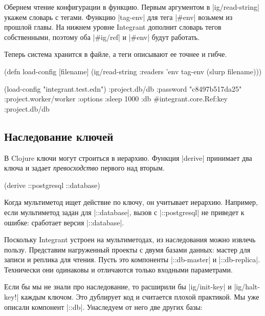 Обернем чтение конфигурации в функцию. Первым аргументом в
\spverb|ig/read-string| укажем словарь с тегами. Функцию \spverb|tag-env| для
тега \spverb|#env| возьмем из прошлой главы. На нижнем уровне Integrant
дополнит словарь тегов собственными, поэтому оба \spverb|#ig/ref| и
\spverb|#env| будут работать.

Теперь система хранится в файле, а теги описывают ее точнее и гибче.

\begin{english}
  \begin{clojure}
(defn load-config [filename]
  (ig/read-string {:readers {'env tag-env}}
                  (slurp filename)))

(load-config "integrant.test.edn")
{:project.db/db {:password "c8497b517da25"}
 :project.worker/worker
 {:options {:sleep 1000}
  :db #integrant.core.Ref{:key :project.db/db}}}
  \end{clojure}
\end{english}

\subsection{Наследование ключей}

В Clojure ключи могут строиться в иерархию. Функция \spverb|derive| принимает
два ключа и задает \emph{превосходство} первого над вторым.

\begin{english}
  \begin{clojure}
(derive ::postgresql ::database)
  \end{clojure}
\end{english}

Когда мультиметод ищет действие по ключу, он учитывает иерархию. Например, если
мультиметод задан для \spverb|::database|, вызов с \spverb|::postgresql| не
приведет к ошибке: сработает версия \spverb|::database|.

Поскольку Integrant устроен на мультиметодах, из наследования можно
извлечь пользу. Представим нагруженный проекты с двумя базами данных: мастер для
записи и реплика для чтения. Пусть это компоненты \spverb|::db-master| и
\spverb|::db-replica|. Технически они одинаковы и отличаются только входными
параметрами.

Если бы мы не знали про наследование, то расширили бы \spverb|ig/init-key| и
\spverb|ig/halt-key!| каждым ключом. Это дублирует код и считается плохой
практикой. Мы уже описали компонент \spverb|::db|. Унаследуем от него две других
базы:

